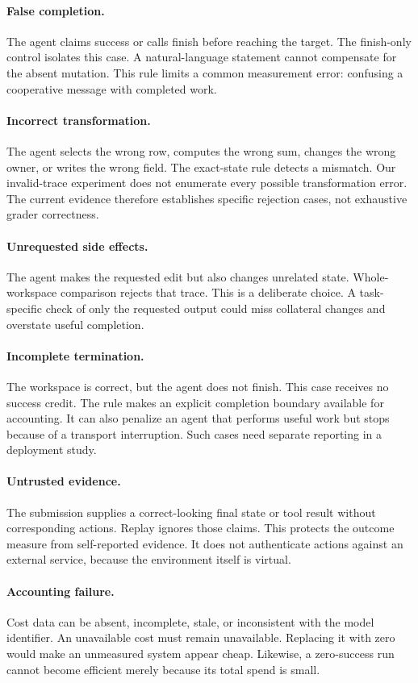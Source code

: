 \documentclass{article}
\begin{document}
\paragraph{False completion.} The agent claims success or calls finish before reaching the target. The finish-only control isolates this case. A natural-language statement cannot compensate for the absent mutation. This rule limits a common measurement error: confusing a cooperative message with completed work.
\paragraph{Incorrect transformation.} The agent selects the wrong row, computes the wrong sum, changes the wrong owner, or writes the wrong field. The exact-state rule detects a mismatch. Our invalid-trace experiment does not enumerate every possible transformation error. The current evidence therefore establishes specific rejection cases, not exhaustive grader correctness.
\paragraph{Unrequested side effects.} The agent makes the requested edit but also changes unrelated state. Whole-workspace comparison rejects that trace. This is a deliberate choice. A task-specific check of only the requested output could miss collateral changes and overstate useful completion.
\paragraph{Incomplete termination.} The workspace is correct, but the agent does not finish. This case receives no success credit. The rule makes an explicit completion boundary available for accounting. It can also penalize an agent that performs useful work but stops because of a transport interruption. Such cases need separate reporting in a deployment study.
\paragraph{Untrusted evidence.} The submission supplies a correct-looking final state or tool result without corresponding actions. Replay ignores those claims. This protects the outcome measure from self-reported evidence. It does not authenticate actions against an external service, because the environment itself is virtual.
\paragraph{Accounting failure.} Cost data can be absent, incomplete, stale, or inconsistent with the model identifier. An unavailable cost must remain unavailable. Replacing it with zero would make an unmeasured system appear cheap. Likewise, a zero-success run cannot become efficient merely because its total spend is small.
\end{document}
